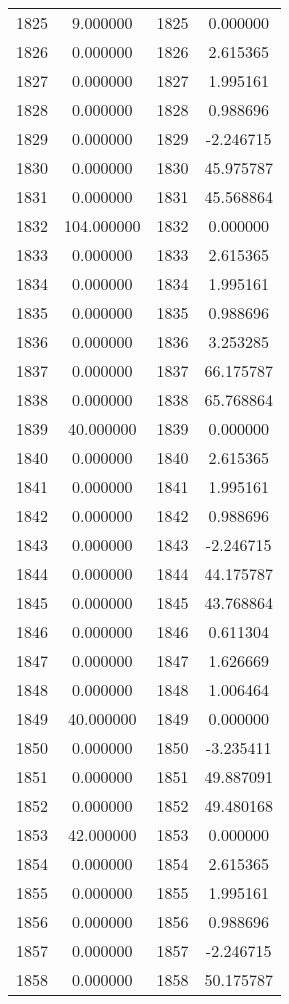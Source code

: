 \documentclass[12pt]{article}
\begin{document}
\begin{longtable}{@{}cccc@{}}
1825 & 9.000000 & 1825 & 0.000000 \\
1826 & 0.000000 & 1826 & 2.615365 \\
1827 & 0.000000 & 1827 & 1.995161 \\
1828 & 0.000000 & 1828 & 0.988696 \\
1829 & 0.000000 & 1829 & -2.246715 \\
1830 & 0.000000 & 1830 & 45.975787 \\
1831 & 0.000000 & 1831 & 45.568864 \\
1832 & 104.000000 & 1832 & 0.000000 \\
1833 & 0.000000 & 1833 & 2.615365 \\
1834 & 0.000000 & 1834 & 1.995161 \\
1835 & 0.000000 & 1835 & 0.988696 \\
1836 & 0.000000 & 1836 & 3.253285 \\
1837 & 0.000000 & 1837 & 66.175787 \\
1838 & 0.000000 & 1838 & 65.768864 \\
1839 & 40.000000 & 1839 & 0.000000 \\
1840 & 0.000000 & 1840 & 2.615365 \\
1841 & 0.000000 & 1841 & 1.995161 \\
1842 & 0.000000 & 1842 & 0.988696 \\
1843 & 0.000000 & 1843 & -2.246715 \\
1844 & 0.000000 & 1844 & 44.175787 \\
1845 & 0.000000 & 1845 & 43.768864 \\
1846 & 0.000000 & 1846 & 0.611304 \\
1847 & 0.000000 & 1847 & 1.626669 \\
1848 & 0.000000 & 1848 & 1.006464 \\
1849 & 40.000000 & 1849 & 0.000000 \\
1850 & 0.000000 & 1850 & -3.235411 \\
1851 & 0.000000 & 1851 & 49.887091 \\
1852 & 0.000000 & 1852 & 49.480168 \\
1853 & 42.000000 & 1853 & 0.000000 \\
1854 & 0.000000 & 1854 & 2.615365 \\
1855 & 0.000000 & 1855 & 1.995161 \\
1856 & 0.000000 & 1856 & 0.988696 \\
1857 & 0.000000 & 1857 & -2.246715 \\
1858 & 0.000000 & 1858 & 50.175787 \\

\end{longtable}
\end{document}
